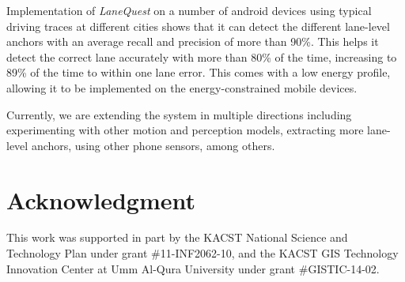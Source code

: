 \documentclass[10pt, conference, compsocconf]{IEEEtran}
\def \sys {\textit{LaneQuest}}
\begin{document}
Implementation of \sys{} on a number of android devices using typical driving traces at different cities shows that it can detect the different lane-level anchors with an average recall and precision of more than 90\%. This helps it detect the correct lane accurately with more than 80\% of the time, increasing to 89\% of the time to within one lane error. This comes with a low energy profile, allowing it to be implemented on the energy-constrained mobile devices.

Currently, we are extending the system in multiple directions including experimenting with other motion and perception models, extracting more lane-level anchors, using other phone sensors, among others.
\section*{Acknowledgment}
This work was supported in part by the KACST National
Science and Technology Plan under grant \#11-INF2062-10,
and the KACST GIS Technology Innovation Center at Umm
Al-Qura University under grant \#GISTIC-14-02.



\end{document}
